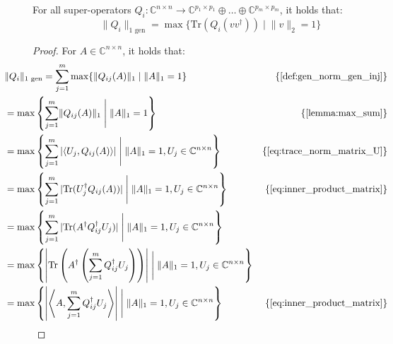 \begin{lemma}\label{thm:Russo–Dye}
  For all super-operators $Q_i: \mathbb{C}^{n \times n} \rightarrow \mathbb{C}^{p_1 \times p_1} \oplus \ldots \oplus \mathbb{C}^{p_m \times p_m}$, it holds that: 
  \begin{equation}
    \lVert Q_i \rVert_{1 \text{ gen}}  = \max \{ \text{Tr}\left(Q_i(vv^{\dag}) \right) \mid \lVert v \rVert_{2}=1 \} 
  \end{equation}
\end{lemma}

\begin{proof}
For $A \in \mathbb{C}^{n \times n}$, it holds that:
  \begin{align} \label{eq:qi_tracenorm_U}
  &\hspace{-30pt} \lVert Q_i \rVert_{1 \text{ gen}}  = \sum_{j=1}^{m}\max \{ \lVert Q_{ij}(A) \rVert_{1} \mid  \lVert A \rVert_{1} =1  \}    & \{\text{\autoref{def:gen_norm_gen_inj}} \} \notag\\
  & \hspace{-30pt}= \max \left\{ \sum_{j=1}^{m} \lVert Q_{ij}(A) \rVert_{1}   \Biggm| \lVert A \rVert_{1} =1 \right\} & \{\text{\autoref{lemma:max_sum}}\} \notag \\
  &\hspace{-30pt} = \max \left\{ \sum_{j=1}^{m} | \langle U_j, Q_{ij}(A) \rangle  |  \Biggm| \lVert A \rVert_{1} =1, U_j \in \mathbb{C}^{n \times n} \right\} & \{\text{\autoref{eq:trace_norm_matrix_U}}\} \notag \\
  & \hspace{-30pt}= \max \left\{ \sum_{j=1}^{m} | \text{Tr} (U_j^{\dag} Q_{ij}(A)) |  \Biggm| \lVert A \rVert_{1} =1,  U_j \in \mathbb{C}^{n \times n}\right\} & \{\text{\autoref{eq:inner_product_matrix}}\} \notag \\
  & \hspace{-30pt} =  \max \left\{ \sum_{j=1}^{m}| \text{Tr} (A^{\dag} Q_{ij}^{\dag}U_j )|  \Biggm| \lVert A \rVert_{1} =1,  U_j \in \mathbb{C}^{n \times n} \right\} \notag \\
  & \hspace{-30pt} = \max \left\{ \left|  \text{Tr} \left(A^{\dag} \left( \sum_{j=1}^{m} Q_{ij}^{\dag}U_j \right) \right)  \right|  \Biggm| \lVert A \rVert_{1} =1,  U_j \in \mathbb{C}^{n \times n} \right\} \notag\\
  & \hspace{-30pt} = \max \left\{  \left| \left\langle A, \sum_{j=1}^{m} Q_{ij}^{\dag}U_j \right\rangle \right|  \Biggm| \lVert A \rVert_{1} =1,  U_j \in \mathbb{C}^{n \times n} \right\} & \{\text{\autoref{eq:inner_product_matrix}}\} 
  \end{align}


\end{proof}
